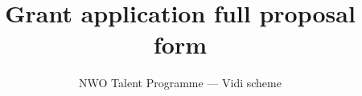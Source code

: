 \documentclass[9.5pt]{Veni}
\title{Grant application full proposal form}
\subtitle{NWO Talent Programme --- Vidi scheme}
\begin{document}
\makenwotitle






\end{document}
